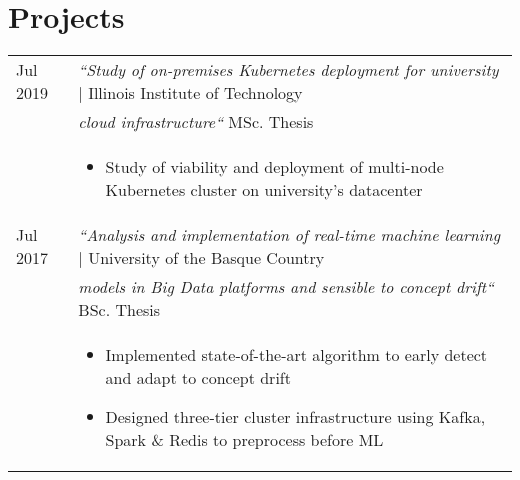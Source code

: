 \documentclass[a4paper,10pt]{article}
\begin{document}
\section{Projects}
\begin{tabular}{p{1.5cm}p{14.8cm}}

  Jul 2019 & \emph{``Study of on-premises Kubernetes deployment for university } \hfill \footnotesize{| Illinois Institute of Technology} \\
  & \hspace{0.1mm} \emph{cloud infrastructure``} \hfill \footnotesize{MSc. Thesis} \\
  & \footnotesize{ \begin{itemize}[noitemsep,topsep=3pt]
  \vspace{-0.1in}
  \item Study of viability and deployment of multi-node Kubernetes cluster on university's datacenter
  \end{itemize}} \vspace{-0.1in} \\ 

  Jul 2017 & \emph{``Analysis and implementation of real-time machine learning } \hfill \footnotesize{| University of the Basque Country} \\
  & \hspace{0.1mm} \emph{models in Big Data platforms and sensible to concept drift``} \hfill \footnotesize{BSc. Thesis} \\
  & \footnotesize{ \begin{itemize}[noitemsep,topsep=3pt]
  \vspace{-0.1in}
  \item Implemented state-of-the-art algorithm to early detect and adapt to concept drift
  \item Designed three-tier cluster infrastructure using Kafka, Spark \& Redis to preprocess before ML
  \end{itemize}} \vspace{-0.1in} \\ 


\end{tabular}
\end{document}
